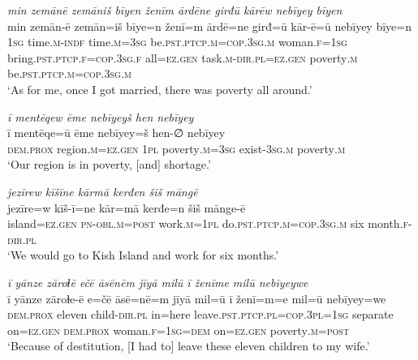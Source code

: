 \ea \label{ŽM.20}
\textit{min zemānē zemāniš bīyen ženīm ārdēne girđū kārēw nebīyey bīyen} \\ 
\gll min zemān-ē zemān=iš bīye=n ženī=m ārdē=ne girđ=ū kār-ē=ū nebīyey bīye=n \\ 
 \textsc{1sg} time\textsc{.m}\textsc{-indf} time\textsc{.m}\textsc{=3sg} be\textsc{.pst}\textsc{.ptcp}\textsc{.m}\textsc{=cop}\textsc{.3sg}\textsc{.m} woman\textsc{.f}\textsc{=\textsc{1sg}} bring\textsc{.pst}\textsc{.ptcp}\textsc{.f}\textsc{=cop}\textsc{.3sg}\textsc{.f} all\textsc{=ez.gen} task\textsc{.m}\textsc{-dir}\textsc{.pl}\textsc{=ez.gen} poverty\textsc{.m} be\textsc{.pst}\textsc{.ptcp}\textsc{.m}\textsc{=cop}\textsc{.3sg}\textsc{.m} \\ 
\glt `As for me, once I got married, there was poverty all around.'
\z 
 
\ea \label{ŽM.21}
\textit{ī mentēqew ēme nebīyeyš hen nebīyey} \\ 
\gll ī mentēqe=ū ēme nebīyey=š hen-∅ nebīyey \\ 
 \textsc{dem.prox} region\textsc{.m}\textsc{=ez.gen} \textsc{1pl} poverty\textsc{.m}\textsc{=3sg} exist\textsc{-3sg}\textsc{.m} poverty\textsc{.m} \\ 
\glt `Our region is in poverty, [and] shortage.'
\z 
 
\ea \label{ŽM.25}
\textit{jezīrew kīšīne kārmā kerđen šiš māngē} \\ 
\gll jezīre=w kīš-ī=ne kār=mā kerđe=n šiš mānge-ē \\ 
 island\textsc{=ez.gen} \textsc{pn}\textsc{-obl}\textsc{.m}\textsc{=\textsc{post}} work\textsc{.m}\textsc{=\textsc{1pl}} do\textsc{.pst}\textsc{.ptcp}\textsc{.m}\textsc{=cop}\textsc{.3sg}\textsc{.m} six month\textsc{.f}\textsc{-dir}\textsc{.pl} \\ 
\glt `We would go to Kish Island and work for six months.'
\z 
 
\ea \label{ŽM.27}
\textit{ī yānze zāroɫē ečē āsēnēm jīyā milū ī ženīme milū nebīyeywe} \\ 
\gll ī yānze zāroɫe-ē e=čē āsē=nē=m jīyā mil=ū ī ženī=m=e mil=ū nebīyey=we \\ 
 \textsc{dem.prox} eleven child\textsc{-dir}\textsc{.pl} in=here leave\textsc{.pst}\textsc{.ptcp}\textsc{.pl}\textsc{=cop}\textsc{.3pl}\textsc{=\textsc{1sg}} separate on\textsc{=ez.gen} \textsc{dem.prox} woman\textsc{.f}\textsc{=\textsc{1sg}}\textsc{=dem} on\textsc{=ez.gen} poverty\textsc{.m}\textsc{=\textsc{post}} \\ 
\glt `Because of destitution, [I had to] leave these eleven children to my wife.'
\z 
 
